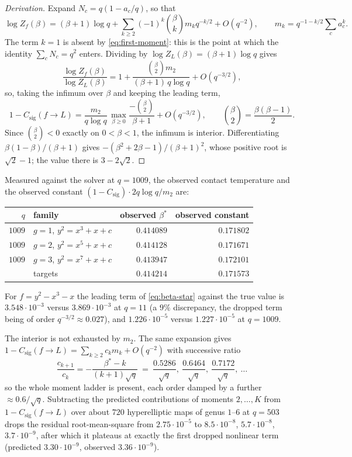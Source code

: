 \documentclass[11pt]{article}
\theoremstyle{definition}
\theoremstyle{plain}
\theoremstyle{remark}
\newcommand{\csig}{C_{\mathrm{sig}}}
\begin{document}
\begin{proof}[Derivation]
Expand \(N_c=q(1-a_c/q)\), so that
\[
  \log Z_f(\beta)=(\beta+1)\log q
  +\sum_{k\ge2}(-1)^k\binom\beta k m_k q^{-k/2}+O(q^{-2}),
  \qquad m_k=q^{-1-k/2}\sum_ca_c^k .
\]
The term \(k=1\) is absent by \eqref{eq:first-moment}: this is the point at
which the identity \(\sum_cN_c=q^2\) enters.  Dividing by
\(\log Z_L(\beta)=(\beta+1)\log q\) gives
\[
  \frac{\log Z_f(\beta)}{\log Z_L(\beta)}
  =1+\frac{\binom\beta2 m_2}{(\beta+1)\,q\log q}+O(q^{-3/2}),
\]
so, taking the infimum over \(\beta\) and keeping the leading term,
\[
  1-\csig(f\to L)
  =\frac{m_2}{q\log q}\,\max_{\beta\ge0}\frac{-\binom\beta2}{\beta+1}
  +O(q^{-3/2}),
  \qquad \binom\beta2=\frac{\beta(\beta-1)}2 .
\]
Since \(\binom\beta2<0\) exactly on \(0<\beta<1\), the infimum is interior.
Differentiating \(\beta(1-\beta)/(\beta+1)\) gives
\(-(\beta^2+2\beta-1)/(\beta+1)^2\), whose positive root is \(\sqrt2-1\); the
value there is \(3-2\sqrt2\).
\end{proof}

Measured against the solver at \(q=1009\), the observed contact temperature and
the observed constant \((1-\csig)\cdot2q\log q/m_2\) are:

\begin{center}
\begin{tabular}{@{}rlrr@{}}
\toprule
\(q\) & family & observed \(\beta^*\) & observed constant\\
\midrule
\(1009\) & \(g=1\), \(y^2=x^3+x+c\) & \(0.414089\) & \(0.171802\)\\
\(1009\) & \(g=2\), \(y^2=x^5+x+c\) & \(0.414128\) & \(0.171671\)\\
\(1009\) & \(g=3\), \(y^2=x^7+x+c\) & \(0.413947\) & \(0.172101\)\\
\midrule
 & targets & \(0.414214\) & \(0.171573\)\\
\bottomrule
\end{tabular}
\end{center}

For \(f=y^2-x^3-x\) the leading term of \eqref{eq:beta-star} against the true
value is \(3.548\cdot10^{-3}\) versus \(3.869\cdot10^{-3}\) at \(q=11\) (a
\(9\%\) discrepancy, the dropped term being of order \(q^{-3/2}\approx0.027\)),
and \(1.226\cdot10^{-5}\) versus \(1.227\cdot10^{-5}\) at \(q=1009\).

The interior is not exhausted by \(m_2\).  The same expansion gives
\(1-\csig(f\to L)=\sum_{k\ge2}c_km_k+O(q^{-2})\) with successive ratio
\begin{equation}
  \frac{c_{k+1}}{c_k}=-\frac{\beta^*-k}{(k+1)\sqrt q}
  \ =\ \frac{0.5286}{\sqrt q},\ \frac{0.6464}{\sqrt q},\ \frac{0.7172}{\sqrt q},\ \ldots
  \label{eq:moment-ladder}
\end{equation}
so the whole moment ladder is present, each order damped by a further
\(\approx0.6/\sqrt q\).  Subtracting the predicted contributions of moments
\(2,\ldots,K\) from \(1-\csig(f\to L)\) over about \(720\) hyperelliptic maps of
genus \(1\)--\(6\) at \(q=503\) drops the residual root-mean-square from
\(2.75\cdot10^{-5}\) to \(8.5\cdot10^{-8}\), \(5.7\cdot10^{-8}\),
\(3.7\cdot10^{-9}\), after which it plateaus at exactly the first dropped
nonlinear term (predicted \(3.30\cdot10^{-9}\), observed \(3.36\cdot10^{-9}\)).
\end{document}
